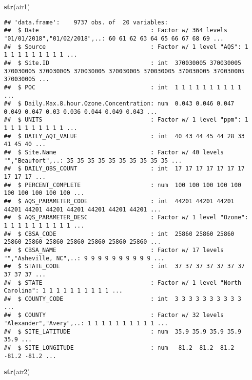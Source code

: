 \documentclass[]{article}
\newenvironment{Shaded}{\begin{snugshade}}{\end{snugshade}}
\newcommand{\KeywordTok}[1]{\textcolor[rgb]{0.13,0.29,0.53}{\textbf{#1}}}
\newcommand{\NormalTok}[1]{#1}
\begin{document}
\begin{Shaded}
\begin{Highlighting}[]
\KeywordTok{str}\NormalTok{(air1)}
\end{Highlighting}
\end{Shaded}

\begin{verbatim}
## 'data.frame':    9737 obs. of  20 variables:
##  $ Date                                : Factor w/ 364 levels "01/01/2018","01/02/2018",..: 60 61 62 63 64 65 66 67 68 69 ...
##  $ Source                              : Factor w/ 1 level "AQS": 1 1 1 1 1 1 1 1 1 1 ...
##  $ Site.ID                             : int  370030005 370030005 370030005 370030005 370030005 370030005 370030005 370030005 370030005 370030005 ...
##  $ POC                                 : int  1 1 1 1 1 1 1 1 1 1 ...
##  $ Daily.Max.8.hour.Ozone.Concentration: num  0.043 0.046 0.047 0.049 0.047 0.03 0.036 0.044 0.049 0.043 ...
##  $ UNITS                               : Factor w/ 1 level "ppm": 1 1 1 1 1 1 1 1 1 1 ...
##  $ DAILY_AQI_VALUE                     : int  40 43 44 45 44 28 33 41 45 40 ...
##  $ Site.Name                           : Factor w/ 40 levels "","Beaufort",..: 35 35 35 35 35 35 35 35 35 35 ...
##  $ DAILY_OBS_COUNT                     : int  17 17 17 17 17 17 17 17 17 17 ...
##  $ PERCENT_COMPLETE                    : num  100 100 100 100 100 100 100 100 100 100 ...
##  $ AQS_PARAMETER_CODE                  : int  44201 44201 44201 44201 44201 44201 44201 44201 44201 44201 ...
##  $ AQS_PARAMETER_DESC                  : Factor w/ 1 level "Ozone": 1 1 1 1 1 1 1 1 1 1 ...
##  $ CBSA_CODE                           : int  25860 25860 25860 25860 25860 25860 25860 25860 25860 25860 ...
##  $ CBSA_NAME                           : Factor w/ 17 levels "","Asheville, NC",..: 9 9 9 9 9 9 9 9 9 9 ...
##  $ STATE_CODE                          : int  37 37 37 37 37 37 37 37 37 37 ...
##  $ STATE                               : Factor w/ 1 level "North Carolina": 1 1 1 1 1 1 1 1 1 1 ...
##  $ COUNTY_CODE                         : int  3 3 3 3 3 3 3 3 3 3 ...
##  $ COUNTY                              : Factor w/ 32 levels "Alexander","Avery",..: 1 1 1 1 1 1 1 1 1 1 ...
##  $ SITE_LATITUDE                       : num  35.9 35.9 35.9 35.9 35.9 ...
##  $ SITE_LONGITUDE                      : num  -81.2 -81.2 -81.2 -81.2 -81.2 ...
\end{verbatim}

\begin{Shaded}
\begin{Highlighting}[]
\KeywordTok{str}\NormalTok{(air2)}
\end{Highlighting}
\end{Shaded}
\end{document}
